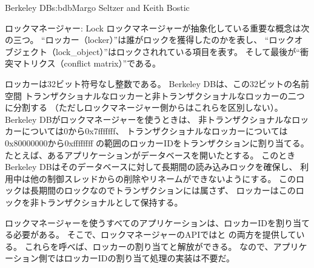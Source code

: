 \begin{aosachapter}{Berkeley DB}{s:bdb}{Margo Seltzer and Keith Bostic}
\begin{aosasect1}{ロックマネージャー: Lock}
ロックマネージャーが抽象化している重要な概念は次の三つ。
``ロッカー（locker）''は誰がロックを獲得したのかを表し、
``ロックオブジェクト（lock\_object）''はロックされれている項目を表す。
そして最後が``衝突マトリクス（conflict matrix）''である。

ロッカーは32ビット符号なし整数である。
Berkeley DBは、この32ビットの名前空間
トランザクショナルなロッカーと非トランザクショナルなロッカーの二つに分割する
（ただしロックマネージャー側からはこれらを区別しない）。
Berkeley DBがロックマネージャーを使うときは、
非トランザクショナルなロッカーについては0から0x7fffffff、
トランザクショナルなロッカーについては0x80000000から0xffffffff
の範囲のロッカーIDをトランザクションに割り当てる。
たとえば、あるアプリケーションがデータベースを開いたとする。
このときBerkeley DBはそのデータベースに対して長期間の読み込みロックを確保し、
利用中は他の制御スレッドからの削除やリネームができないようにする。
このロックは長期間のロックなのでトランザクションには属さず、
ロッカーはこのロックを非トランザクショナルとして保持する。

ロックマネージャーを使うすべてのアプリケーションは、ロッカーIDを割り当てる必要がある。
そこで、ロックマネージャーのAPIではと
の両方を提供している。
これらを呼べば、ロッカーの割り当てと解放ができる。
なので、アプリケーション側ではロッカーIDの割り当て処理の実装は不要だ。


\end{aosasect1}
\end{aosachapter}
